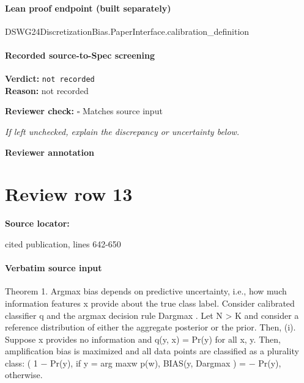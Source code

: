 \documentclass[10pt]{article}
\newcommand{\reviewerbox}{%
  \par\noindent\fbox{\parbox{0.96\linewidth}{\rule{0pt}{0.38in}}}\par
}
\newcommand{\reviewmatch}[1]{%
  \par\noindent\textbf{Reviewer check:} $\square$\; #1\par
  \noindent\emph{If left unchecked, explain the discrepancy or uncertainty below.}\par
}
\begin{document}
\paragraph{Lean proof endpoint (built separately)}\begin{ReviewVerbatim}
DSWG24DiscretizationBias.PaperInterface.calibration_definition
\end{ReviewVerbatim}

\paragraph{Recorded source-to-Spec screening}
\textbf{Verdict:} \texttt{not recorded}
\\
\textbf{Reason:} not recorded
\reviewmatch{Matches source input}
\noindent\textbf{Reviewer annotation}\par
\reviewerbox
\clearpage
\hypertarget{source-claim-861b407dcf52f582}{}
\section*{Review row 13}
\textbf{Source locator:} {\footnotesize\raggedright cited publication, lines 642-\allowbreak{}650\par}
\paragraph{Verbatim source input}
\begin{ReviewVerbatim}
Theorem 1. Argmax bias depends on predictive uncertainty, i.e., how much information features x provide
about the true class label. Consider calibrated classifier q and the argmax decision rule Dargmax . Let N > K
and consider a reference distribution of either the aggregate posterior or the prior. Then,
  (i). Suppose x provides no information and q(y, x) = Pr(y) for all x, y. Then, amplification bias is
       maximized and all data points are classified as a plurality class:
                                                  (
                                                    1 − Pr(y), if y = arg maxw p(w),
                            BIAS(y, Dargmax ) =
                                                    − Pr(y),      otherwise.
\end{ReviewVerbatim}
\end{document}
